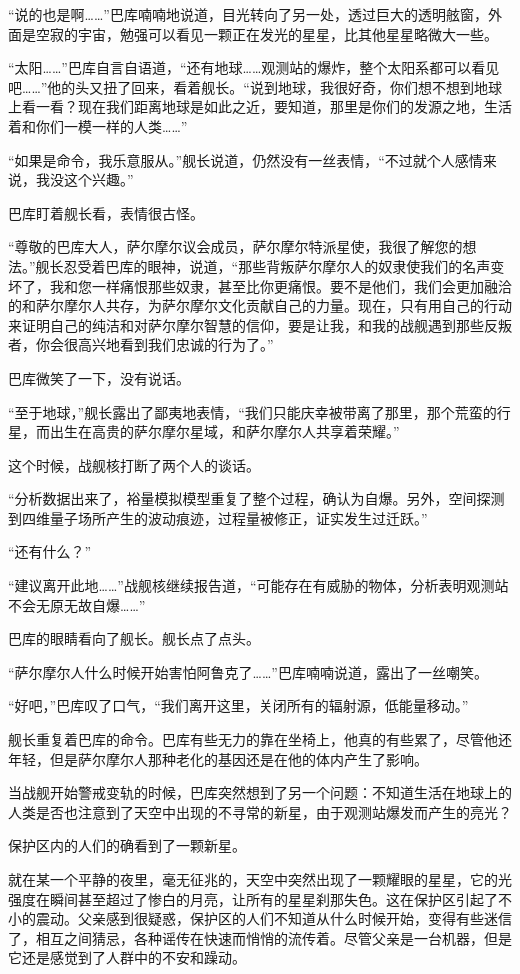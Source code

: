 “说的也是啊……”巴库喃喃地说道，目光转向了另一处，透过巨大的透明舷窗，外面是空寂的宇宙，勉强可以看见一颗正在发光的星星，比其他星星略微大一些。

“太阳……”巴库自言自语道，“还有地球……观测站的爆炸，整个太阳系都可以看见吧……”他的头又扭了回来，看着舰长。“说到地球，我很好奇，你们想不想到地球上看一看？现在我们距离地球是如此之近，要知道，那里是你们的发源之地，生活着和你们一模一样的人类……”

“如果是命令，我乐意服从。”舰长说道，仍然没有一丝表情，“不过就个人感情来说，我没这个兴趣。”

巴库盯着舰长看，表情很古怪。

“尊敬的巴库大人，萨尔摩尔议会成员，萨尔摩尔特派星使，我很了解您的想法。”舰长忍受着巴库的眼神，说道，“那些背叛萨尔摩尔人的奴隶使我们的名声变坏了，我和您一样痛恨那些奴隶，甚至比你更痛恨。要不是他们，我们会更加融洽的和萨尔摩尔人共存，为萨尔摩尔文化贡献自己的力量。现在，只有用自己的行动来证明自己的纯洁和对萨尔摩尔智慧的信仰，要是让我，和我的战舰遇到那些反叛者，你会很高兴地看到我们忠诚的行为了。”

巴库微笑了一下，没有说话。

“至于地球，”舰长露出了鄙夷地表情，“我们只能庆幸被带离了那里，那个荒蛮的行星，而出生在高贵的萨尔摩尔星域，和萨尔摩尔人共享着荣耀。”

这个时候，战舰核打断了两个人的谈话。

“分析数据出来了，裕量模拟模型重复了整个过程，确认为自爆。另外，空间探测到四维量子场所产生的波动痕迹，过程量被修正，证实发生过迁跃。”

“还有什么？”

“建议离开此地……”战舰核继续报告道，“可能存在有威胁的物体，分析表明观测站不会无原无故自爆……”

巴库的眼睛看向了舰长。舰长点了点头。

“萨尔摩尔人什么时候开始害怕阿鲁克了……”巴库喃喃说道，露出了一丝嘲笑。

“好吧，”巴库叹了口气，“我们离开这里，关闭所有的辐射源，低能量移动。”

舰长重复着巴库的命令。巴库有些无力的靠在坐椅上，他真的有些累了，尽管他还年轻，但是萨尔摩尔人那种老化的基因还是在他的体内产生了影响。

当战舰开始警戒变轨的时候，巴库突然想到了另一个问题：不知道生活在地球上的人类是否也注意到了天空中出现的不寻常的新星，由于观测站爆发而产生的亮光？

保护区内的人们的确看到了一颗新星。

就在某一个平静的夜里，毫无征兆的，天空中突然出现了一颗耀眼的星星，它的光强度在瞬间甚至超过了惨白的月亮，让所有的星星刹那失色。这在保护区引起了不小的震动。父亲感到很疑惑，保护区的人们不知道从什么时候开始，变得有些迷信了，相互之间猜忌，各种谣传在快速而悄悄的流传着。尽管父亲是一台机器，但是它还是感觉到了人群中的不安和躁动。

